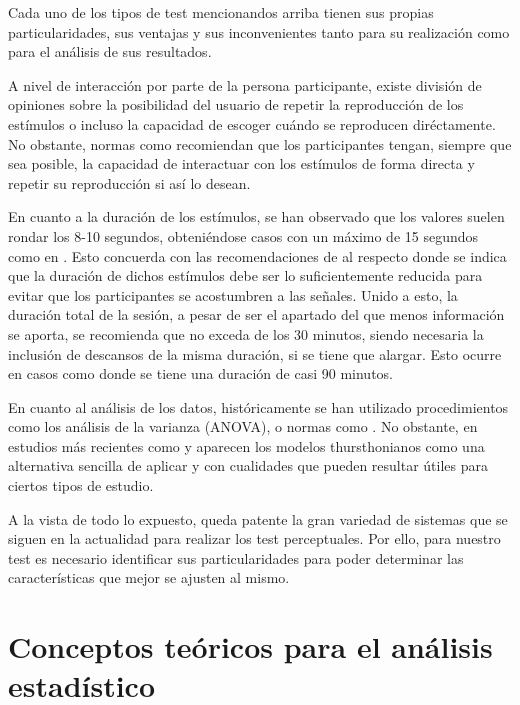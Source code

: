 \documentclass[11pt,a4paper]{book}
\begin{document}
    Cada uno de los tipos de test mencionandos arriba tienen sus propias particularidades, sus ventajas y sus inconvenientes tanto para su realización como para el análisis de sus resultados.
    
    A nivel de interacción por parte de la persona participante, existe división de opiniones sobre la posibilidad del usuario de repetir la reproducción de los estímulos o incluso la capacidad de escoger cuándo se reproducen diréctamente. No obstante, normas como \cite{UIT1116,UIT1534, UIT1284,EBU3286, UIT1285, UIT1286} recomiendan que los participantes tengan, siempre que sea posible, la capacidad de interactuar con los estímulos de forma directa y repetir su reproducción si así lo desean.
    
    En cuanto a la duración de los estímulos, se han observado que los valores suelen rondar los 8-10 segundos, obteniéndose casos con un máximo de 15 segundos como en \cite{2005IWitew}. Esto concuerda con las recomendaciones de \cite{UIT1116,UIT1534, UIT1284,EBU3286, UIT1285, UIT1286} al respecto donde se indica que la duración de dichos estímulos debe ser lo suficientemente reducida para evitar que los participantes se acostumbren a las señales. Unido a esto, la duración total de la sesión, a pesar de ser el apartado del que menos información se aporta, se recomienda que no exceda de los 30 minutos, siendo necesaria la inclusión de descansos de la misma duración, si se tiene que alargar. Esto ocurre en casos como \cite{2019LKritly} donde se tiene una duración de casi 90 minutos.
    
    En cuanto al análisis de los datos, históricamente se han utilizado procedimientos como los análisis de la varianza (ANOVA), o normas como \cite{ISO10399}. No obstante, en estudios más recientes como \cite{delaPrida2021} y \cite{delaPrida2019} aparecen los modelos thursthonianos como una alternativa sencilla de aplicar y con cualidades que pueden resultar útiles para ciertos tipos de estudio.\newline
    
    A la vista de todo lo expuesto, queda patente la gran variedad de sistemas que se siguen en la actualidad para realizar los test perceptuales. Por ello, para nuestro test es necesario identificar sus particularidades para poder determinar las características que mejor se ajusten al mismo.
    
    \section{Conceptos teóricos para el análisis estadístico}    
\end{document}

